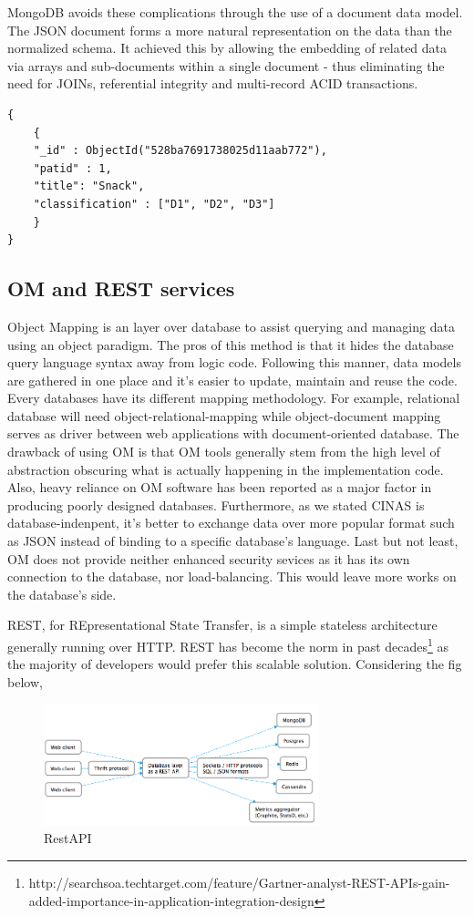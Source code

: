 \documentclass{sig-alternate}
\begin{document}
{MongoDB avoids these complications through the use of a document data model. The JSON document forms a more natural representation on the data than the normalized schema. It achieved this by allowing the embedding of related data via arrays and sub-documents within a single document - thus eliminating the need for JOINs, referential integrity and multi-record ACID transactions.

\begin{lstlisting}[caption=Json Example]
{
	{
	"_id" : ObjectId("528ba7691738025d11aab772"),
	"patid" : 1,
	"title": "Snack",
	"classification" : ["D1", "D2", "D3"]
	}
}
\end{lstlisting}

\subsection{OM and REST services}

Object Mapping is an layer over database to assist querying and managing data using an object paradigm. The pros of this method is that it hides the database query language syntax away from logic code. Following this manner, data models are gathered in one place and it's easier to update, maintain and reuse the code. Every databases have its different mapping methodology. For example, relational database will need object-relational-mapping while object-document mapping serves as driver between web applications with document-oriented database. The drawback of using OM is that OM tools generally stem from the high level of abstraction obscuring what is actually happening in the implementation code. Also, heavy reliance on OM software has been reported as a major factor in producing poorly designed databases. Furthermore, as we stated CINAS is database-indenpent, it's better to exchange data over more popular format such as JSON instead of binding to a specific database's language. Last but not least, OM does not provide neither enhanced security sevices as it has its own connection to the database, nor load-balancing. This would leave more works on the database's side.

REST, for REpresentational State Transfer, is a simple stateless architecture generally running over HTTP. REST has become the norm in past decades\footnote{http://searchsoa.techtarget.com/feature/Gartner-analyst-REST-APIs-gain-added-importance-in-application-integration-design
} as the majority of developers would prefer this scalable solution. Considering the fig below,
\begin{figure}[htb]
\centering
\includegraphics[width=80mm,scale=10]{restapi.png}
\caption{ RestAPI }
\end{figure}

}
\end{document}

